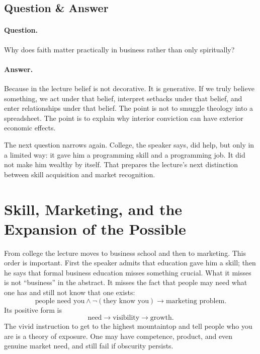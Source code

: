 \subsection{Question \& Answer}

\paragraph{Question.} Why does faith matter practically in business rather than only spiritually?

\paragraph{Answer.} Because in the lecture belief is not decorative. It is generative. If we truly believe something, we act under that belief, interpret setbacks under that belief, and enter relationships under that belief. The point is not to smuggle theology into a spreadsheet. The point is to explain why interior conviction can have exterior economic effects.

The next question narrows again. College, the speaker says, did help, but only in a limited way: it gave him a programming skill and a programming job. It did not make him wealthy by itself. That prepares the lecture's next distinction between skill acquisition and market recognition.

\section{Skill, Marketing, and the Expansion of the Possible}

From college the lecture moves to business school and then to marketing. This order is important. First the speaker admits that education gave him a skill; then he says that formal business education misses something crucial. What it misses is not ``business'' in the abstract. It misses the fact that people may need what one has and still not know that one exists:
\begin{equation}
\text{people need you} \land \neg(\text{they know you}) \to \text{marketing problem}.
\end{equation}
Its positive form is
\begin{equation}
\text{need} \to \text{visibility} \to \text{growth}.
\end{equation}
The vivid instruction to get to the highest mountaintop and tell people who you are is a theory of exposure. One may have competence, product, and even genuine market need, and still fail if obscurity persists.

